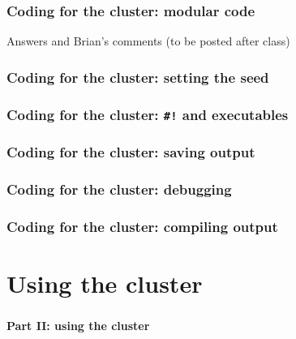 \documentclass[12pt, 
hyperref={colorlinks=true, linkcolor=BlueViolet, urlcolor=BlueViolet},dvipsnames]{beamer}
\begin{document}
\begin{frame}
\frametitle{Coding for the cluster: modular code}

Answers and Brian's comments (to be posted after class)

\end{frame}

\begin{frame}
\frametitle{Coding for the cluster: setting the seed}

\end{frame}

\begin{frame}
\frametitle{Coding for the cluster: \texttt{\#!} and executables}
\end{frame}

\begin{frame}
\frametitle{Coding for the cluster: saving output}

\end{frame}

\begin{frame}
\frametitle{Coding for the cluster: debugging}

\end{frame}


\begin{frame}
\frametitle{Coding for the cluster: compiling output}

\end{frame}

\section{Using the cluster}
\begin{frame}
\frametitle{}
\begin{center}
{\large \textbf{Part II: using the cluster}}
\end{center}
\end{frame}
\end{document}
